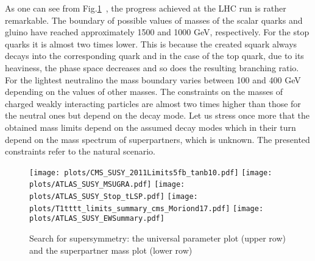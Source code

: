 \documentclass{cernyrep}
\begin{document}
As one can see from Fig.\ref{susysearch}~\cite{SUSY_serches}, the progress achieved at the LHC run is rather remarkable. The boundary of possible values of masses of the scalar quarks and gluino have reached approximately 1500 and 1000 GeV, respectively.  For the stop quarks it is almost two times lower. This is because the created squark always decays into the corresponding quark and in the case of the top quark, due to its heaviness, the phase space decreases and so does the resulting branching ratio. For the lightest neutralino the mass boundary varies between 100 and 400 GeV depending on the values of other masses. The constraints on the masses of charged weakly interacting particles  are almost two times higher than those for the neutral ones but depend on the decay mode. Let us stress once more that the obtained mass limits depend on the assumed decay modes which in their turn depend on the mass spectrum  of superpartners, which is unknown.  The presented constraints refer to the natural scenario. 
\begin{figure}[htb]
\begin{center}
\centering
\texttt{[image: plots/CMS\_SUSY\_2011Limits5fb\_tanb10.pdf]}
\texttt{[image: plots/ATLAS\_SUSY\_MSUGRA.pdf]}\vspace{0.5cm}
\texttt{[image: plots/ATLAS\_SUSY\_Stop\_tLSP.pdf]}
\texttt{[image: plots/T1tttt\_limits\_summary\_cms\_Moriond17.pdf]}
\texttt{[image: plots/ATLAS\_SUSY\_EWSummary.pdf]}
\end{center}
\caption{Search for supersymmetry: the universal parameter plot (upper row) and the superpartner mass plot (lower row)}
\label{susysearch}
\end{figure}
\end{document}
